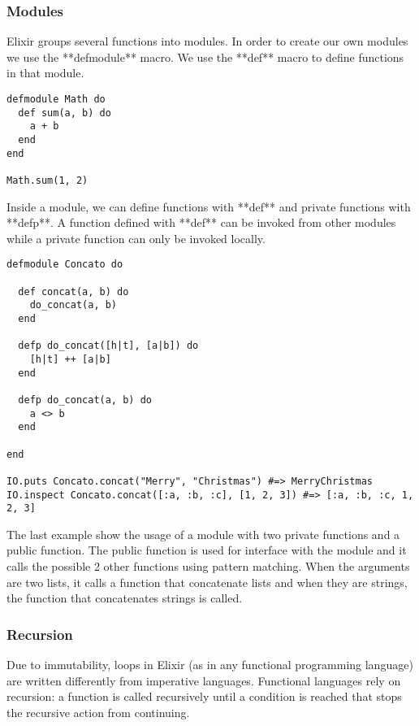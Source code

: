 \subsubsection{Modules}

Elixir groups several functions into modules. In order to create our own modules
we use the **defmodule** macro. We use the **def** macro to define functions in
that module.

\begin{lstlisting}[label=esum,caption=Elixir Module example]
defmodule Math do
  def sum(a, b) do
    a + b
  end
end

Math.sum(1, 2)
\end{lstlisting}

Inside a module, we can define functions with **def** and private functions with
**defp**. A function defined with **def** can be invoked from other modules
while a private function can only be invoked locally.

\begin{lstlisting}[label=econc,caption=Elixir pattern matching and function visibility]
defmodule Concato do

  def concat(a, b) do
    do_concat(a, b)
  end

  defp do_concat([h|t], [a|b]) do
    [h|t] ++ [a|b]
  end

  defp do_concat(a, b) do
    a <> b
  end

end

IO.puts Concato.concat("Merry", "Christmas") #=> MerryChristmas
IO.inspect Concato.concat([:a, :b, :c], [1, 2, 3]) #=> [:a, :b, :c, 1, 2, 3]
\end{lstlisting}

The last example show the usage of a module with two private functions and a
public function. The public function is used for interface with the module and
it calls the possible 2 other functions using pattern matching. When the
arguments are two lists, it calls a function that concatenate lists and when
they are strings, the function that concatenates strings is called.

\subsubsection{Recursion}

Due to immutability, loops in Elixir (as in any functional programming language)
are written differently from imperative languages. Functional languages rely on
recursion: a function is called recursively until a condition is reached that
stops the recursive action from continuing.

